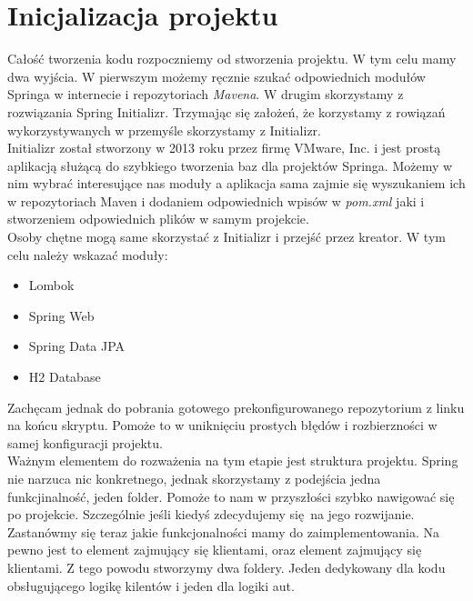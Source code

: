 \documentclass{article}
\begin{document}
    \section{Inicjalizacja projektu}
        Całość tworzenia kodu rozpoczniemy od stworzenia projektu. W tym celu mamy dwa wyjścia. W pierwszym możemy ręcznie szukać odpowiednich modułów Springa w internecie i repozytoriach \emph{Mavena}. W drugim skorzystamy z rozwiązania Spring Initializr. Trzymając się założeń, że korzystamy z rowiązań wykorzystywanych w przemyśle skorzystamy z Initializr. \\
        Initializr został stworzony w 2013 roku przez firmę VMware, Inc. i jest prostą aplikacją służącą do szybkiego tworzenia baz dla projektów Springa. Możemy w nim wybrać interesujące nas moduły a aplikacja sama zajmie się wyszukaniem ich w repozytoriach Maven i dodaniem odpowiednich wpisów w \emph{pom.xml} jaki i stworzeniem odpowiednich plików w samym projekcie. \\
        Osoby chętne mogą same skorzystać z Initializr i przejść przez kreator. W tym celu należy wskazać moduły:
        \begin{itemize}
            \item Lombok
            \item Spring Web
            \item Spring Data JPA
            \item H2 Database
        \end{itemize}
        Zachęcam jednak do pobrania gotowego prekonfigurowanego repozytorium z linku na końcu skryptu. Pomoże to w uniknięciu prostych błędów i rozbierzności w samej konfiguracji projektu. \\
        Ważnym elementem do rozważenia na tym etapie jest struktura projektu. Spring nie narzuca nic konkretnego, jednak skorzystamy z podejścia jedna funkcjinalność, jeden folder. Pomoże to nam w przyszłości szybko nawigować się po projekcie. Szczególnie jeśli kiedyś zdecydujemy się na jego rozwijanie. Zastanówmy się teraz jakie funkcjonalności mamy do zaimplementowania. Na pewno jest to element zajmujący się klientami, oraz element zajmujący się klientami. Z tego powodu stworzymy dwa foldery. Jeden dedykowany dla kodu obsługującego logikę kilentów i jeden dla logiki aut.
        
\end{document}
